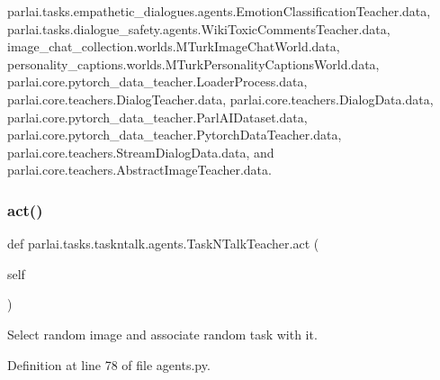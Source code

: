 parlai.\+tasks.\+empathetic\+\_\+dialogues.\+agents.\+Emotion\+Classification\+Teacher.\+data, parlai.\+tasks.\+dialogue\+\_\+safety.\+agents.\+Wiki\+Toxic\+Comments\+Teacher.\+data, image\+\_\+chat\+\_\+collection.\+worlds.\+M\+Turk\+Image\+Chat\+World.\+data, personality\+\_\+captions.\+worlds.\+M\+Turk\+Personality\+Captions\+World.\+data, parlai.\+core.\+pytorch\+\_\+data\+\_\+teacher.\+Loader\+Process.\+data, parlai.\+core.\+teachers.\+Dialog\+Teacher.\+data, parlai.\+core.\+teachers.\+Dialog\+Data.\+data, parlai.\+core.\+pytorch\+\_\+data\+\_\+teacher.\+Parl\+A\+I\+Dataset.\+data, parlai.\+core.\+pytorch\+\_\+data\+\_\+teacher.\+Pytorch\+Data\+Teacher.\+data, parlai.\+core.\+teachers.\+Stream\+Dialog\+Data.\+data, and parlai.\+core.\+teachers.\+Abstract\+Image\+Teacher.\+data.

\mbox{\label{classparlai_1_1tasks_1_1taskntalk_1_1agents_1_1TaskNTalkTeacher_a56446edc110472e01536e12f5c6eac3c}} 
\subsubsection{\texorpdfstring{act()}{act()}}
{\footnotesize\ttfamily def parlai.\+tasks.\+taskntalk.\+agents.\+Task\+N\+Talk\+Teacher.\+act (\begin{DoxyParamCaption}\item[{}]{self }\end{DoxyParamCaption})}

\begin{DoxyVerb}Select random image and associate random task with it.\end{DoxyVerb}
 

Definition at line 78 of file agents.\+py.



